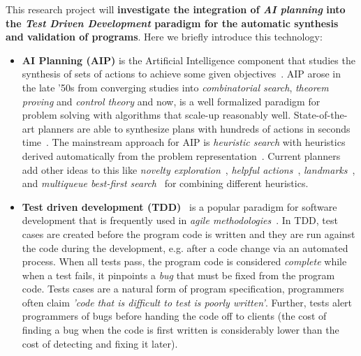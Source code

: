 \documentclass[10pt,a4paper]{paper}
\begin{document}
This research project will {\bf investigate the integration of {\em AI planning} into the {\em Test Driven Development} paradigm for the automatic synthesis and validation of programs}. Here we briefly introduce this technology:
\begin{itemize}
\item {\bf AI Planning (AIP)} is the Artificial Intelligence component that studies the synthesis of sets of actions to achieve some given objectives~\cite{ghallab2004automated}. AIP arose in the late ’50s from converging studies into {\em combinatorial search}, {\em theorem proving} and {\em control theory} and now, is a well formalized paradigm for problem solving with algorithms that scale-up reasonably well. State-of-the-art planners are able to synthesize plans with hundreds of actions in seconds time~\cite{geffner2013concise}.  The mainstream approach for AIP is {\em heuristic search} with heuristics derived automatically from the problem representation~\cite{mcdermott1996heuristic,bonet2001planning}.  Current planners add other ideas to this like {\it novelty exploration}~\cite{geffner:psimulators:IJCAI17}, {\it helpful actions}~\cite{hoffmann2001ff}, {\it landmarks}~\cite{helmert2006fast}, and {\it multiqueue best-first search}~\cite{richter2010lama} for combining different heuristics.
  
\item {\bf Test driven development (TDD)}~\cite{beck:TDD:2003} is a popular paradigm for software development that is frequently used in {\it agile methodologies}~\cite{cohen2003agile}. In TDD, test cases are created before the program code is written and they are run against the code during the development, e.g. after a code change via an automated process. When all tests pass, the program code is considered {\em complete} while when a test fails, it pinpoints a {\em bug} that must be fixed from the program code. Tests cases are a natural form of program specification, programmers often claim {\em 'code that is difficult to test is poorly written'}. Further, tests alert programmers of bugs before handing the code off to clients (the cost of finding a bug when the code is first written is considerably lower than the cost of detecting and fixing it later). %
\end{itemize}
\end{document}
